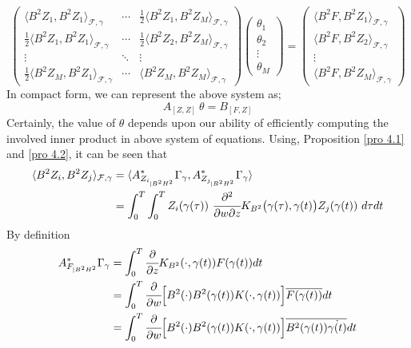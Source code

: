\documentclass[preprint,12pt]{elsarticle} %
\theoremstyle{plain}
\theoremstyle{definition}
\theoremstyle{remark}
\begin{document}
\[
\begin{pmatrix}
    \langle B^2 Z_1, B^2 Z_1\rangle_{\mathcal{F},\gamma}  &\cdots &\frac{1}{2}\langle B^2 Z_1, B^2 Z_M\rangle_{\mathcal{F},\gamma}\\
    
    \frac{1}{2}\langle B^2 Z_1, B^2 Z_1\rangle_{\mathcal{F},\gamma} &  \cdots & \frac{1}{2}\langle B^2 Z_2, B^2 Z_M\rangle_{\mathcal{F},\gamma}\\
\vdots & \ddots & \vdots\\
\frac{1}{2}\langle B^2 Z_M, B^2 Z_1\rangle_{\mathcal{F},\gamma} &  \cdots & \langle B^2 Z_M, B^2 Z_M\rangle_{\mathcal{F},\gamma}
\end{pmatrix}
\begin{pmatrix}
    \theta_1\\
    \theta_2\\
    \vdots\\
    \theta_M
\end{pmatrix}
= 
\begin{pmatrix}
    \langle B^2 F, B^2 Z_1\rangle_{\mathcal{F},\gamma}\\
    \langle B^2 F, B^2 Z_2\rangle_{\mathcal{F},\gamma}\\
    \vdots\\
    \langle B^2 F, B^2 Z_M\rangle_{\mathcal{F},\gamma}
\end{pmatrix}
\]
In compact form, we can represent the above system as;
\begin{equation}\label{psuedo}
    A_{[Z,Z]}~\theta = B_{[F,Z]}
\end{equation}
 Certainly, the value of $\theta$ depends upon our ability of efficiently computing the involved inner product in above system of equations. Using, Proposition \ref{pro 4.1} and \ref{pro 4.2}, it can be seen that
\begin{align*}
    \langle B^2 Z_i, B^2 Z_j\rangle_{\mathcal{F},\gamma} &= \langle A_{Z_{i_{|B^2H^2}}}^{*}\Gamma_{\gamma}, A_{Z_{j_{|B^2H^2}}}^{*}\Gamma_{\gamma}\rangle\\ 
    &= \int_{0}^{T}\int_{0}^{T} Z_{i}(\gamma(\tau)) ~\cfrac{\partial^2}{\partial w \partial z}K_{B^2}\big(\gamma(\tau), \gamma(t)\big)Z_{j}(\gamma(t))~d\tau dt
\end{align*}
By definition 
\begin{align*}
    A_{F_{|B^2H^2}}^{*}\Gamma_{\gamma} &= \int_{0}^{T} \cfrac{\partial}{\partial z}K_{B^2}(\cdot, \gamma(t))F(\gamma(t))dt\\
    &= \int_{0}^{T} \cfrac{\partial}{\partial w}\Big[B^2(\cdot) B^2(\gamma(t)) K(\cdot,\gamma(t))\Big]\overline{F(\gamma(t))}dt\\ 
    &= \int_{0}^{T} \cfrac{\partial}{\partial w}\Big[B^2(\cdot) B^2(\gamma(t)) K(\cdot,\gamma(t))\Big]\overline{B^2(\gamma(t))\dot{\gamma(t)}}dt
\end{align*}
\end{document}

